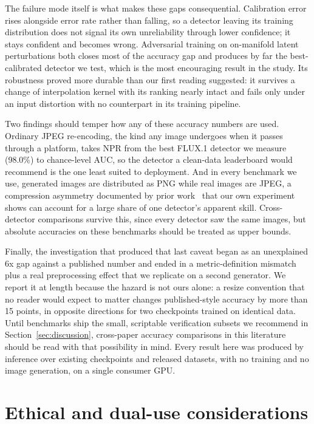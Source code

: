 \documentclass[3p,times,procedia]{elsarticle}
\begin{document}
The failure mode itself is what makes these gaps consequential. Calibration
error rises alongside error rate rather than falling, so a detector leaving
its training distribution does not signal its own unreliability through
lower confidence; it stays confident and becomes wrong. Adversarial
training on on-manifold latent perturbations both closes most of the
accuracy gap and produces by far the best-calibrated detector we test,
which is the most encouraging result in the study. Its robustness proved
more durable than our first reading suggested: it survives a change of
interpolation kernel with its ranking nearly intact and fails only under an
input distortion with no counterpart in its training pipeline.

Two findings should temper how any of these accuracy numbers are used.
Ordinary JPEG re-encoding, the kind any image undergoes when it passes
through a platform, takes NPR from the best FLUX.1 detector we measure
(98.0\%) to chance-level AUC, so the detector a clean-data leaderboard
would recommend is the one least suited to deployment. And in every
benchmark we use, generated images are distributed as PNG while real images
are JPEG, a compression asymmetry documented by prior
work~\cite{grommelt2024jpeg} that our own experiment shows can account for
a large share of one detector's apparent skill. Cross-detector comparisons
survive this, since every detector saw the same images, but absolute
accuracies on these benchmarks should be treated as upper bounds.

Finally, the investigation that produced that last caveat began as an
unexplained 6x gap against a published number and ended in a
metric-definition mismatch plus a real preprocessing effect that we
replicate on a second generator. We report it at length because the hazard
is not ours alone: a resize convention that no reader would expect to
matter changes published-style accuracy by more than 15 points, in
opposite directions for two checkpoints trained on identical data. Until
benchmarks ship the small, scriptable verification subsets we recommend in
Section~\ref{sec:discussion}, cross-paper accuracy comparisons in this
literature should be read with that possibility in mind. Every result here
was produced by inference over existing checkpoints and released datasets,
with no training and no image generation, on a single consumer GPU.

\section{Ethical and dual-use considerations}
\label{sec:ethics}
\end{document}
